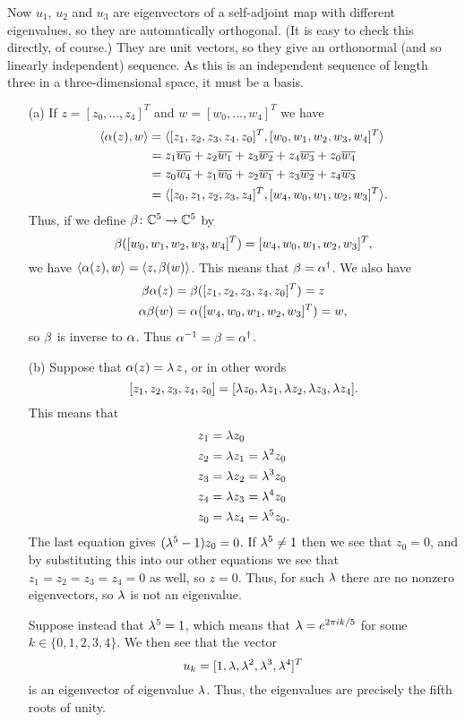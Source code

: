 \begin{itemize}
   Now $u_1$, $u_2$ and $u_3$ are eigenvectors of a self-adjoint
   map with different eigenvalues, so they are automatically
   orthogonal.  (It is easy to check this directly, of course.)  They
   are unit vectors, so they give an orthonormal (and so linearly
   independent) sequence.  As this is an independent sequence of
   length three in a three-dimensional space, it must be a basis.
 \end{itemize}
\EndDeferredSolution

 \begin{itemize}
  \item[(a)] If $z=[z_0,\dotsc,z_4]^T$ and $w=[w_0,\dotsc,w_4]^T$ we
   have
   \begin{align*}
    \langle \alpha(z),w\rangle &=
     \langle [z_1,z_2,z_3,z_4,z_0]^T,[w_0,w_1,w_2,w_3,w_4]^T\rangle \\
    &= z_1\overline{w_0} + z_2\overline{w_1} + z_3\overline{w_2} + z_4\overline{w_3} + z_0\overline{w_4} \\
    &= z_0\overline{w_4} + z_1\overline{w_0} + z_2\overline{w_1} + z_3\overline{w_2} + z_4\overline{w_3} \\
    &= \langle [z_0,z_1,z_2,z_3,z_4]^T,[w_4,w_0,w_1,w_2,w_3]^T\rangle. \\
   \end{align*}
   Thus, if we define $\beta\colon{\mathbb{C}}^5\to{\mathbb{C}}^5$ by
   \[ \beta([w_0,w_1,w_2,w_3,w_4]^T) = [w_4,w_0,w_1,w_2,w_3]^T, \]
   we have $\langle \alpha(z),w\rangle=\langle z,\beta(w)\rangle$.  This means that
   $\beta=\alpha^\dag$.  We also have
   \begin{align*}
    \beta\alpha(z) &= \beta([z_1,z_2,z_3,z_4,z_0]^T) = z \\
    \alpha\beta(w) &= \alpha([w_4,w_0,w_1,w_2,w_3]^T) = w,
   \end{align*}
   so $\beta$ is inverse to $\alpha$.  Thus $\alpha^{-1}=\beta=\alpha^\dag$.
  \item[(b)] Suppose that $\alpha(z)=\lambda\,z$, or in other words
   \[ [z_1,z_2,z_3,z_4,z_0] =
       [\lambda z_0,\lambda z_1,\lambda z_2,\lambda z_3,\lambda z_4].
   \]
   This means that
   \begin{align*}
    z_1 &= \lambda z_0 \\
    z_2 &= \lambda z_1 = \lambda^2 z_0 \\
    z_3 &= \lambda z_2 = \lambda^3 z_0 \\
    z_4 &= \lambda z_3 = \lambda^4 z_0 \\
    z_0 &= \lambda z_4 = \lambda^5 z_0.
   \end{align*}
   The last equation gives $(\lambda^5-1)z_0=0$.  If $\lambda^5\neq 1$ then we
   see that $z_0=0$, and by substituting this into our other
   equations we see that $z_1=z_2=z_3=z_4=0$ as well, so $z=0$.  Thus,
   for such $\lambda$ there are no nonzero eigenvectors, so $\lambda$ is not
   an eigenvalue.

   Suppose instead that $\lambda^5=1$, which means that $\lambda=e^{2\pi
    ik/5}$ for some $k\in\{0,1,2,3,4\}$.  We then see that the vector
   \[ u_k = [1,\lambda,\lambda^2,\lambda^3,\lambda^4]^T \]
   is an eigenvector of eigenvalue $\lambda$.  Thus, the eigenvalues are
   precisely the fifth roots of unity.
 \end{itemize}
\EndDeferredSolution

